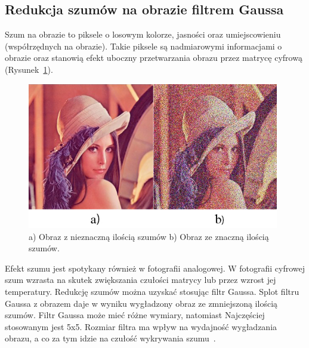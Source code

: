 \documentclass[a4paper,twoside,12pt]{book}
\begin{document}
    \subsection{Redukcja szumów na obrazie filtrem Gaussa}\label{subsec:redukcja-szumów-na-obrazie-filtrem-gaussa}
    Szum na obrazie to piksele o losowym kolorze, jasności oraz umiejscowieniu (współrzędnych na obrazie).
    Takie piksele są nadmiarowymi informacjami o obrazie oraz stanowią efekt uboczny przetwarzania obrazu
    przez matrycę cyfrową (Rysunek~\ref{fig.lenkaSzumy}).

    \begin{figure}
        \centering
        \includegraphics[width=11cm]{Obrazy/lenkaSzumy.jpg}
        \caption{a) Obraz z nieznaczną ilością szumów b) Obraz ze znaczną ilością szumów.~\cite{lenkaSzumy}}
        \label{fig.lenkaSzumy}
    \end{figure}

    Efekt szumu jest spotykany również w fotografii analogowej.
    W fotografii cyfrowej szum wzrasta na skutek zwiększania czułości matrycy lub przez wzrost jej temperatury.
    Redukcję szumów można uzyskać stosując filtr Gaussa.
    Splot filtru Gaussa z obrazem daje w wyniku wygładzony obraz ze zmniejszoną ilością szumów.
    Filtr Gaussa może mieć różne wymiary, natomiast
    Najczęściej stosowanym jest 5x5.
    Rozmiar filtra ma wpływ na wydajność wygładzania obrazu, a co za tym idzie na czułość wykrywania szumu~\cite{Canny}.
\end{document}
